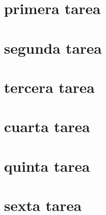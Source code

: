 \chapter{primera tarea}
    
\chapter{segunda tarea}
    
\chapter{tercera tarea}
    
\chapter{cuarta tarea}
    
\chapter{quinta tarea}
    
\chapter{sexta tarea}
    
